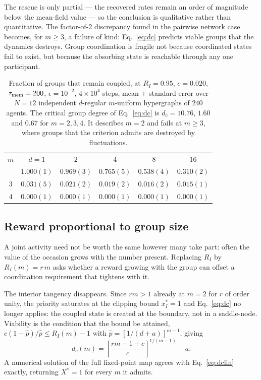 \documentclass[aps,pre,twocolumn,superscriptaddress,floatfix,longbibliography]{revtex4-2}
\begin{document}
The rescue is only partial --- the recovered rates remain an order of magnitude
below the mean-field value --- so the conclusion is qualitative rather than
quantitative. The factor-of-$2$ discrepancy found in the pairwise
network case becomes, for $m\ge3$, a failure of kind: Eq.~\eqref{eq:dc} predicts viable
groups that the dynamics destroys. Group coordination is fragile not because
coordinated states fail to exist, but because the absorbing state is reachable
through any one participant.

\begin{table}[t]
\caption{Fraction of groups that remain coupled, at $R_I=0.95$, $c=0.020$,
$\tau_{\rm mem}=200$, $\epsilon=10^{-2}$, $4\times10^{4}$ steps, mean $\pm$
standard error over $N=12$ independent $d$-regular $m$-uniform hypergraphs of
$240$ agents. The critical group degree of Eq.~\eqref{eq:dc} is $d_c=10.76$,
$1.60$ and $0.67$ for $m=2,3,4$. It describes $m=2$ and fails at $m\ge3$, where
groups that the criterion admits are destroyed by fluctuations.}
\label{tab:hyper}
\begin{ruledtabular}
\begin{tabular}{cccccc}
$m$ & $d=1$ & $2$ & $4$ & $8$ & $16$ \\
\colrule
2 & $1.000(1)$ & $0.969(3)$ & $0.765(5)$ & $0.538(4)$ & $0.310(2)$ \\
3 & $0.031(5)$ & $0.021(2)$ & $0.019(2)$ & $0.016(2)$ & $0.015(1)$ \\
4 & $0.000(1)$ & $0.000(1)$ & $0.000(1)$ & $0.000(1)$ & $0.000(1)$ \\
\end{tabular}
\end{ruledtabular}
\end{table}

\subsection{Reward proportional to group size}

A joint activity need not be worth the same however many take part: often the
value of the occasion grows with the number present. Replacing $R_I$ by
$R_I(m)=r\,m$ asks whether a reward growing with the group can offset a
coordination requirement that tightens with it.

The interior tangency disappears. Since $rm>1$ already at $m=2$ for $r$ of order
unity, the priority saturates at the clipping bound $x_I^{*}=1$ and
Eq.~\eqref{eq:dc} no longer applies: the coupled state is created at the
boundary, not in a saddle-node. Viability is the condition that the bound be
attained,
$c(1-\hat p)/\hat p \le R_I(m)-1$ with $\hat p=[1/(d+a)]^{m-1}$, giving
\begin{equation}
  d_c(m)=\left[\frac{r m-1+c}{c}\right]^{1/(m-1)}-a .
  \label{eq:dclin}
\end{equation}
A numerical solution of the full fixed-point map agrees with
Eq.~\eqref{eq:dclin} exactly, returning $X^{*}=1$ for every $m$ it admits.
\end{document}
